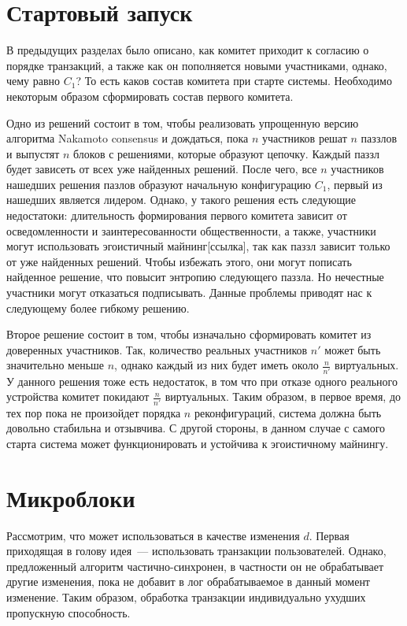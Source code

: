 \section{Стартовый запуск}
В предыдущих разделах было описано, как комитет приходит к согласию о порядке транзакций, а также как он пополняется новыми участниками, однако, чему равно $C_1$? То есть каков состав комитета при старте системы. Необходимо некоторым образом сформировать состав первого комитета.

Одно из решений состоит в том, чтобы реализовать упрощенную версию алгоритма Nakamoto consensus и дождаться, пока $n$ участников решат $n$ паззлов и выпустят $n$ блоков с решениями, которые образуют цепочку. Каждый паззл будет зависеть от всех уже найденных решений. После чего, все $n$ участников нашедших решения пазлов образуют начальную конфигурацию $C_1$, первый из нашедших является лидером.
Однако, у такого решения есть следующие недостатоки: длительность формирования первого комитета зависит от осведомленности и заинтересованности общественности, а также, участники могут использовать эгоистичный майнинг[ссылка], так как паззл зависит только от уже найденных решений. Чтобы избежать этого, они могут пописать найденное решение, что повысит энтропию следующего паззла. Но нечестные участники могут отказаться подписывать. Данные проблемы приводят нас к следующему более гибкому решению.

Второе решение состоит в том, чтобы изначально сформировать комитет из доверенных участников. Так, количество реальных участников $n'$ может быть значительно меньше $n$, однако каждый из них будет иметь около $\frac{n}{n'}$ виртуальных. У данного решения тоже есть недостаток, в том что при отказе одного реального устройства комитет покидают $\frac{n}{n'}$ виртуальных. Таким образом, в первое время, до тех пор пока не произойдет порядка $n$ реконфигураций, система должна быть довольно стабильна и отзывчива.
С другой стороны, в данном случае с самого старта система может функционировать и устойчива к эгоистичному майнингу.

\section{Микроблоки}
Рассмотрим, что может использоваться в качестве изменения $d$. Первая приходящая в голову идея~--- использовать транзакции пользователей. Однако, предложенный алгоритм частично-синхронен, в частности он не обрабатывает другие изменения, пока не добавит в лог обрабатываемое в данный момент изменение. Таким образом, обработка транзакции индивидуально ухудших пропускную способность.

